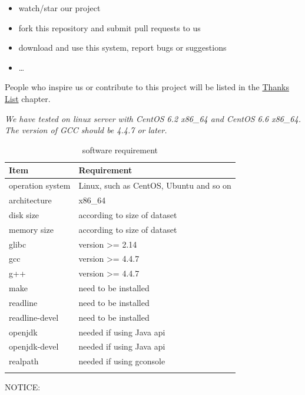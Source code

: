\documentclass[titlepage, a4paper, 12pt]{article}
\begin{document}
\begin{itemize}
\item
  watch/star our project
\item
  fork this repository and submit pull requests to us
\item
  download and use this system, report bugs or suggestions
\item
  \ldots{}
\end{itemize}

People who inspire us or contribute to this project will be listed in the \hyperref[chapter16]{Thanks List} chapter.

\clearpage


\emph{We have tested on linux server with CentOS 6.2 x86\_64 and CentOS 6.6 x86\_64. The version of GCC should be 4.4.7 or later.}

\begin{longtable}[c]{@{}ll@{}}
\toprule
Item & Requirement\tabularnewline
\midrule
\endhead
operation system & Linux, such as CentOS, Ubuntu and so on\tabularnewline
architecture & x86\_64\tabularnewline
disk size & according to size of dataset\tabularnewline
memory size & according to size of dataset\tabularnewline
glibc & version \textgreater{}= 2.14\tabularnewline
gcc & version \textgreater{}= 4.4.7\tabularnewline
g++ & version \textgreater{}= 4.4.7\tabularnewline
make & need to be installed\tabularnewline
readline & need to be installed\tabularnewline
readline-devel & need to be installed\tabularnewline
openjdk & needed if using Java api\tabularnewline
openjdk-devel & needed if using Java api\tabularnewline
realpath & needed if using gconsole\tabularnewline
\bottomrule
\caption{software requirement}
\end{longtable}

NOTICE:
\end{document}
